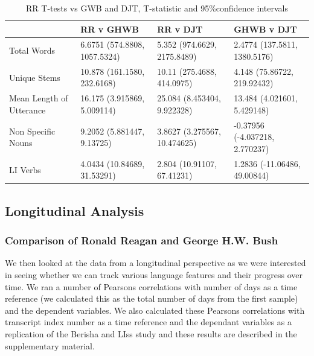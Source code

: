 \documentclass[12pt]{article}
\begin{document}
\begin{table}[H]
	\begin{center}
	\begin{tabular}{ | p{3cm} | p{2.2cm} | p{2.2cm} | p{2.2cm} |}
		\hline
		& RR v GHWB & RR v DJT & GHWB v DJT \\ \hline
		Total Words & 6.6751 (574.8808, 1057.5324) & 5.352 (974.6629, 2175.8489) & 2.4774 (137.5811, 1380.5176) \\ \hline
		Unique Stems & 10.878 (161.1580, 232.6168) & 10.11 (275.4688, 414.0975) & 4.148 (75.86722, 219.92432) \\ \hline
		Mean Length of Utterance & 16.175 (3.915869, 5.009114) & 25.084 (8.453404, 9.922328)  & 13.484 (4.021601, 5.429148) \\ \hline	
		Non Specific Nouns & 9.2052 (5.881447, 9.13725) & 3.8627 (3.275567, 10.474625) & -0.37956 (-4.037218, 2.770237) \\ \hline
		LI Verbs & 4.0434 (10.84689, 31.53291) & 2.804 (10.91107, 67.41231) & 1.2836 (-11.06486, 49.00844)\\ \hline
	\end{tabular}
	\caption{\label{tab:table-name}RR T-tests vs GWB and DJT, T-statistic and 95\%confidence intervals}
	\end{center} 
\end{table}

\subsection{Longitudinal Analysis}
\subsubsection{Comparison of Ronald Reagan and George H.W. Bush}
We then looked at the data from a longitudinal perspective as we were interested in seeing whether we can track various language features and their progress over time. We ran a number of Pearsons correlations with number of days as a time reference (we calculated this as the total number of days from the first sample) and the dependent variables. We also calculated these Pearsons correlations with transcript index number as a time reference and the dependant variables as a replication of the Berisha and LIss study \cite{Berisha2015} and these results are described in the supplementary material.
\end{document}
